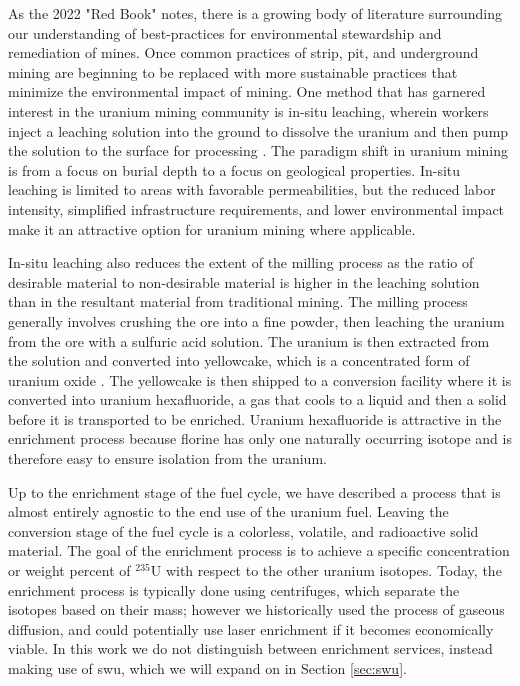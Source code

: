 As the 2022 "Red Book" notes, there is a growing body of literature surrounding our understanding of best-practices for environmental stewardship and remediation of mines. Once common practices of strip, pit, and underground mining are beginning to be replaced with more sustainable practices that minimize the environmental impact of mining. One method that has garnered interest in the uranium mining community is in-situ leaching, wherein workers inject a leaching solution into the ground to dissolve the uranium and then pump the solution to the surface for processing \cite{insitu_review_2024}. The paradigm shift in uranium mining is from a focus on burial depth to a focus on geological properties. In-situ leaching is limited to areas with favorable permeabilities, but the reduced labor intensity, simplified infrastructure requirements, and lower environmental impact make it an attractive option for uranium mining where applicable.

In-situ leaching also reduces the extent of the milling process as the ratio of desirable material to non-desirable material is higher in the leaching solution than in the resultant material from traditional mining. The milling process generally involves crushing the ore into a fine powder, then leaching the uranium from the ore with a sulfuric acid solution. The uranium is then extracted from the solution and converted into yellowcake, which is a concentrated form of uranium oxide \cite{milling_uranium_2022}. The yellowcake is then shipped to a conversion facility where it is converted into uranium hexafluoride, a gas that cools to a liquid and then a solid before it is transported to be enriched. Uranium hexafluoride is attractive in the enrichment process because florine has only one naturally occurring isotope and is therefore easy to ensure isolation from the uranium.

Up to the enrichment stage of the fuel cycle, we have described a process that is almost entirely agnostic to the end use of the uranium fuel. Leaving the conversion stage of the fuel cycle is a colorless, volatile, and radioactive solid material. The goal of the enrichment process is to achieve a specific concentration or weight percent of $^{235}$U with respect to the other uranium isotopes. Today, the enrichment process is typically done using centrifuges, which separate the isotopes based on their mass; however we historically used the process of gaseous diffusion, and could potentially use laser enrichment if it becomes economically viable. In this work we do not distinguish between enrichment services, instead making use of \gls{swu}, which we will expand on in Section \ref{sec:swu}.

